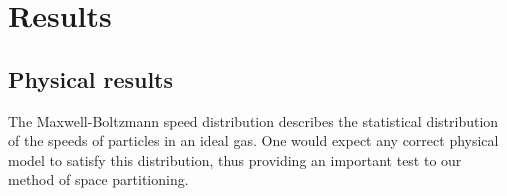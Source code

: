 \section{Results}
\subsection{Physical results}

The Maxwell-Boltzmann speed distribution describes the statistical distribution 
of the speeds of particles in an ideal gas. One would expect any correct 
physical model to satisfy this distribution, thus providing an important test 
to our method of space partitioning.

